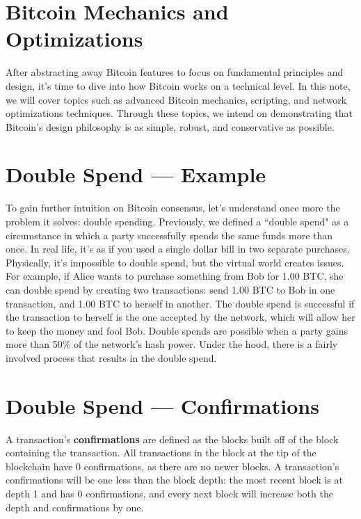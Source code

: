\documentclass[full.tex]{subfiles}
\begin{document}
    \thispagestyle{firstpage}
    \vspace*{2\baselineskip}
    
    
    \section*{Bitcoin Mechanics and Optimizations}
    
    After abstracting away Bitcoin features to focus on fundamental principles and design, it's time to dive into how Bitcoin works on a technical level. In this note, we will cover topics such as advanced Bitcoin mechanics, scripting, and network optimizations techniques. Through these topics, we intend on demonstrating that Bitcoin's design philosophy is as simple, robust, and conservative as possible.
    
     \section*{Double Spend --- Example}
 
     To gain further intuition on Bitcoin consensus, let's understand once more the problem it solves: double spending. Previously, we defined a ``double spend" as a circumstance in which a party successfully spends the same funds more than once. In real life, it's as if you used a single dollar bill in two separate purchases. Physically, it's impossible to double spend, but the virtual world creates issues. For example, if Alice wants to purchase something from Bob for 1.00 BTC, she can double spend by creating two transactions: send 1.00 BTC to Bob in one transaction, and 1.00 BTC to herself in another. The double spend is successful if the transaction to herself is the one accepted by the network, which will allow her to keep the money and fool Bob. Double spends are possible when a party gains more than 50\% of the network's hash power. Under the hood, there is a fairly involved process that results in the double spend.
     
     \section*{Double Spend --- Confirmations}
     
     A transaction's \textbf{confirmations} are defined as the blocks built off of the block containing the transaction. All transactions in the block at the tip of the blockchain have 0 confirmations, as there are no newer blocks. A transaction's confirmations will be one less than the block depth: the most recent block is at depth 1 and has 0 confirmations, and every next block will increase both the depth and confirmations by one.
 
\end{document}
